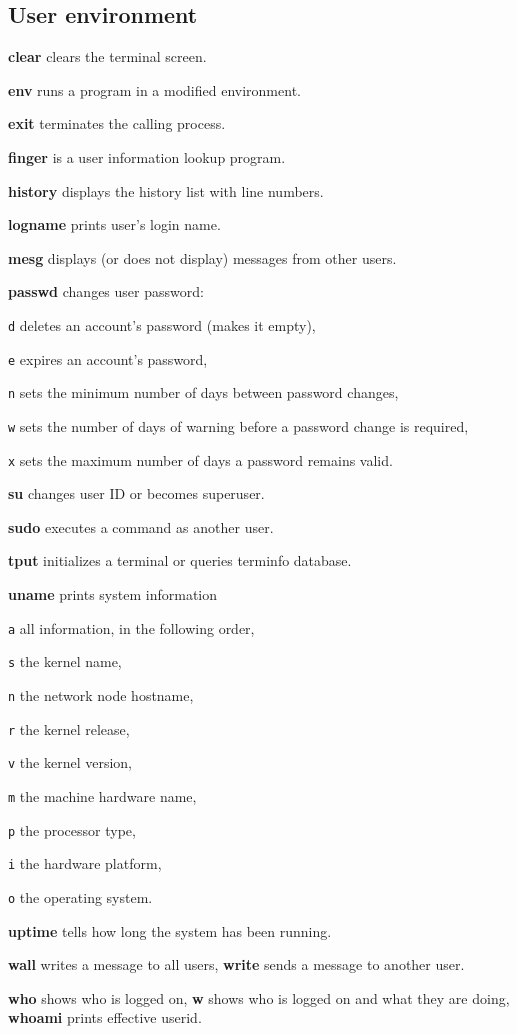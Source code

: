 \subsection{User environment}
\textbf{clear} clears the terminal screen. 

\textbf{env} runs a program in a modified environment.

\textbf{exit} terminates the calling process.

\textbf{finger} is a user information lookup program. 

\textbf{history} displays the history list with line numbers.

\textbf{logname} prints user's login name.

\textbf{mesg} displays (or does not display) messages from other users.

\textbf{passwd} changes user password:
\begin{enumx}
	\item [\texttt{d}] deletes an account's password (makes it empty),
	\item [\texttt{e}] expires an account's password,
	\item [\texttt{n}] sets the minimum number of days between password changes,
	\item [\texttt{w}] sets the number of days of warning 
	before a password change is required,
	\item [\texttt{x}] sets the maximum number of days a password remains valid.
\end{enumx}

\textbf{su} changes user ID or becomes superuser.

\textbf{sudo} executes a command as another user.


\textbf{tput} initializes a terminal or queries terminfo database.

\textbf{uname} prints system information
\begin{enumx}
	\item [\texttt{a}] all information, in the following order,
	\item [\texttt{s}] the kernel name,
	\item [\texttt{n}] the network node hostname,
	\item [\texttt{r}] the kernel release,
	\item [\texttt{v}] the kernel version,
	\item [\texttt{m}] the machine hardware name,
	\item [\texttt{p}] the processor type,
	\item [\texttt{i}] the hardware platform,
	\item [\texttt{o}] the operating system.
\end{enumx}

\textbf{uptime} tells how long the system has been running.

\textbf{wall} writes a message to all users,
\textbf{write} sends a message to another user. 

\textbf{who} shows who is logged on,
\textbf{w} shows who is logged on and what they are doing,
\textbf{whoami} prints effective userid.